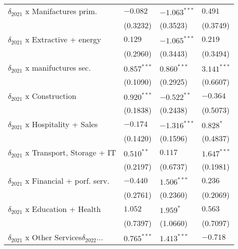 \begin{tabular}{llll}
$\delta_{2021}$ x Manifactures prim.               &           $-0.082$ &     $-1.063^{***}$ &            $0.491$ \\
                                                   &           (0.3232) &           (0.3523) &           (0.3749) \\
$\delta_{2021}$ x Extractive + energy              &            $0.129$ &     $-1.065^{***}$ &            $0.219$ \\
                                                   &           (0.2960) &           (0.3443) &           (0.3494) \\
$\delta_{2021}$ x manifuctures sec.                &      $0.857^{***}$ &      $0.860^{***}$ &      $3.141^{***}$ \\
                                                   &           (0.1090) &           (0.2925) &           (0.6607) \\
$\delta_{2021}$ x Construction                     &      $0.920^{***}$ &      $-0.522^{**}$ &           $-0.364$ \\
                                                   &           (0.1838) &           (0.2438) &           (0.5073) \\
$\delta_{2021}$ x Hospitality + Sales              &           $-0.174$ &     $-1.316^{***}$ &          $0.828^*$ \\
                                                   &           (0.1420) &           (0.1596) &           (0.4837) \\
$\delta_{2021}$ x Transport, Storage + IT          &       $0.510^{**}$ &            $0.117$ &      $1.647^{***}$ \\
                                                   &           (0.2197) &           (0.6737) &           (0.1981) \\
$\delta_{2021}$ x Financial + porf. serv.          &           $-0.440$ &      $1.506^{***}$ &            $0.236$ \\
                                                   &           (0.2761) &           (0.2360) &           (0.2069) \\
$\delta_{2021}$ x Education + Health               &            $1.052$ &          $1.959^*$ &            $0.563$ \\
                                                   &           (0.7397) &           (1.0660) &           (0.7097) \\
$\delta_{2021}$ x Other Services$\delta_{2022}$... &      $0.765^{***}$ &      $1.413^{***}$ &           $-0.718$ \\

\end{tabular}
